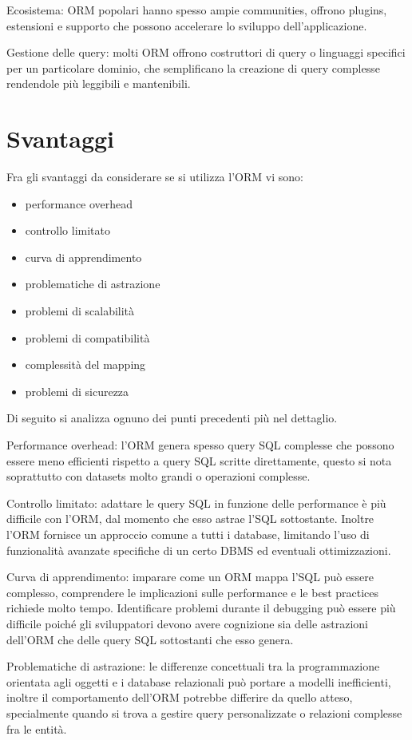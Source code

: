 Ecosistema: ORM popolari hanno spesso ampie communities, offrono plugins, estensioni e supporto che possono accelerare lo sviluppo dell'applicazione.

Gestione delle query: molti ORM offrono costruttori di query o linguaggi specifici per un particolare dominio, che semplificano la creazione di query complesse rendendole più leggibili e mantenibili.

\section{Svantaggi}

Fra gli svantaggi da considerare se si utilizza l'ORM vi sono:

\begin{itemize}
\item performance overhead
\item controllo limitato
\item curva di apprendimento
\item problematiche di astrazione
\item problemi di scalabilità
\item problemi di compatibilità
\item complessità del mapping
\item problemi di sicurezza
\end{itemize}

Di seguito si analizza ognuno dei punti precedenti più nel dettaglio.

Performance overhead: l'ORM genera spesso query SQL complesse che possono essere meno efficienti rispetto a query SQL scritte direttamente, questo si nota soprattutto con datasets molto grandi o operazioni complesse.

Controllo limitato: adattare le query SQL in funzione delle performance è più difficile con l'ORM, dal momento che esso astrae l'SQL sottostante. Inoltre l'ORM fornisce un approccio comune a tutti i database, limitando l'uso di funzionalità avanzate specifiche di un certo DBMS ed eventuali ottimizzazioni.

Curva di apprendimento: imparare come un ORM mappa l'SQL può essere complesso, comprendere le implicazioni sulle performance e le best practices richiede molto tempo. Identificare problemi durante il debugging può essere più difficile poiché gli sviluppatori devono avere cognizione sia delle astrazioni dell'ORM che delle query SQL sottostanti che esso genera.

Problematiche di astrazione: le differenze concettuali tra la programmazione orientata agli oggetti e i database relazionali può portare a modelli inefficienti, inoltre il comportamento dell'ORM potrebbe differire da quello atteso, specialmente quando si trova a gestire query personalizzate o relazioni complesse fra le entità.

